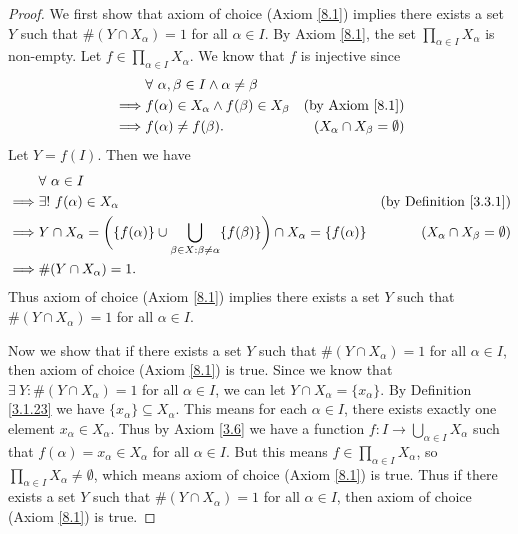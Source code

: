 \begin{proof}
    We first show that axiom of choice (Axiom \ref{8.1}) implies there exists a set \(Y\) such that \(\#(Y \cap X_{\alpha}) = 1\) for all \(\alpha \in I\).
    By Axiom \ref{8.1}, the set \(\prod_{\alpha \in I} X_{\alpha}\) is non-empty.
    Let \(f \in \prod_{\alpha \in I} X_{\alpha}\).
    We know that \(f\) is injective since
    \begin{align*}
        & \forall\ \alpha, \beta \in I \land \alpha \neq \beta \\
        \implies & f(\alpha) \in X_{\alpha} \land f(\beta) \in X_{\beta} & \text{(by Axiom \ref{8.1})} \\
        \implies & f(\alpha) \neq f(\beta). & (X_{\alpha} \cap X_{\beta} = \emptyset)
    \end{align*}
    Let \(Y = f(I)\).
    Then we have
    \begin{align*}
        & \forall\ \alpha \in I \\
        \implies & \exists!\ f(\alpha) \in X_{\alpha} & \text{(by Definition \ref{3.3.1})} \\
        \implies & Y \cap X_{\alpha} = \bigg(\{f(\alpha)\} \cup \bigcup_{\beta \in X : \beta \neq \alpha} \{f(\beta)\}\bigg) \cap X_\alpha = \{f(\alpha)\} & (X_{\alpha} \cap X_{\beta} = \emptyset) \\
        \implies & \#(Y \cap X_{\alpha}) = 1.
    \end{align*}
    Thus axiom of choice (Axiom \ref{8.1}) implies there exists a set \(Y\) such that \(\#(Y \cap X_{\alpha}) = 1\) for all \(\alpha \in I\).

    Now we show that if there exists a set \(Y\) such that \(\#(Y \cap X_{\alpha}) = 1\) for all \(\alpha \in I\), then axiom of choice (Axiom \ref{8.1}) is true.
    Since we know that \(\exists\ Y : \#(Y \cap X_{\alpha}) = 1\) for all \(\alpha \in I\), we can let \(Y \cap X_{\alpha} = \{x_{\alpha}\}\).
    By Definition \ref{3.1.23} we have \(\{x_\alpha\} \subseteq X_{\alpha}\).
    This means for each \(\alpha \in I\), there exists exactly one element \(x_{\alpha} \in X_{\alpha}\).
    Thus by Axiom \ref{3.6} we have a function \(f : I \to \bigcup_{\alpha \in I} X_{\alpha}\) such that \(f(\alpha) = x_{\alpha} \in X_{\alpha}\) for all \(\alpha \in I\).
    But this means \(f \in \prod_{\alpha \in I} X_{\alpha}\), so \(\prod_{\alpha \in I} X_{\alpha} \neq \emptyset\), which means axiom of choice (Axiom \ref{8.1}) is true.
    Thus if there exists a set \(Y\) such that \(\#(Y \cap X_{\alpha}) = 1\) for all \(\alpha \in I\), then axiom of choice (Axiom \ref{8.1}) is true.
\end{proof}